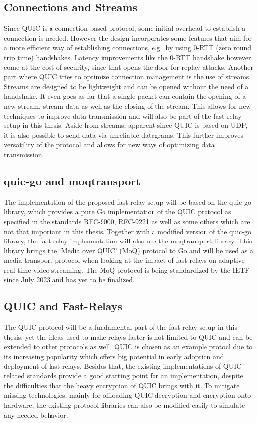 \subsection{Connections and Streams}
Since QUIC is a connection-based protocol, some initial overhead to establish a connection is needed.
However the design incorporates some features that aim for a more efficient way of establishing 
connections, e.g.\ by using 0-RTT (zero round trip time) handshakes.
Latency improvements like the 0-RTT handshake however come at the cost of security, since that opens 
the door for replay attacks.
Another part where QUIC tries to optimize connection management is the use of streams.
Streams are designed to be lightweight and can be opened without the need of a handshake.
It even goes as far that a single packet can contain the opening of a new stream, stream data
as well as the closing of the stream.
This allows for new techniques to improve data transmission and will also be part of the fast-relay 
setup in this thesis.
Aside from streams, apparent since QUIC is based on UDP, it is also possible to send data via
unreliable datagrams.
This further improves versatility of the protocol and allows for new ways of optimizing data transmission.

\subsection{quic-go and moqtransport}
The implementation of the proposed fast-relay setup will be based on the quic-go library, which provides a
pure Go implementation of the QUIC protocol as specified in the standards RFC-9000, RFC-9221 as well as some
others which are not that important in this thesis. Together with a modified version of the quic-go library,
the fast-relay implementation will also use the moqtransport library.
This library brings the `Media over QUIC' (MoQ) protocol to Go and will be used as a media transport protocol 
when looking at the impact of fast-relays on adaptive real-time video streaming.
The MoQ protocol is being standardized by the IETF since July 2023 and has yet to be finalized. 

\subsection{QUIC and Fast-Relays}
The QUIC protocol will be a fundamental part of the fast-relay setup in this thesis, yet the ideas used 
to make relays faster is not limited to QUIC and can be extended to other protocols as well.
QUIC is chosen as an example protocl due to its increasing popularity which offers big potential 
in early adoption and deployment of fast-relays.
Besides that, the existing implementations of QUIC related standards provide a good starting point for
an implementation, despite the difficulties that the heavy encryption of QUIC brings with it.
To mitigate missing technologies, mainly for offloading QUIC decryption and encryption onto hardware,
the existing protocol libraries can also be modified easily to simulate any needed behavior.
